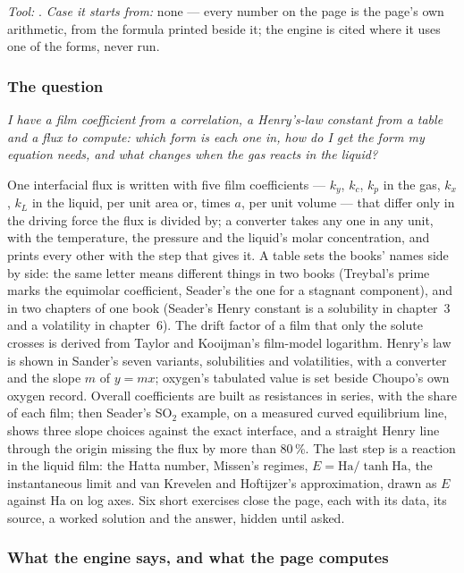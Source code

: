 \documentclass[11pt,a4paper]{article}
\begin{document}

\noindent\textit{\small Tool:} .  \textit{\small
Case it starts from:} none --- every number on the page is the page's own
arithmetic, from the formula printed beside it; the engine is cited where it
uses one of the forms, never run.

\subsubsection*{The question}

\emph{I have a film coefficient from a correlation, a Henry's-law constant from
a table and a flux to compute: which form is each one in, how do I get the form
my equation needs, and what changes when the gas reacts in the liquid?}

One interfacial flux is written with five film coefficients --- $k_y$, $k_c$,
$k_p$ in the gas, $k_x$, $k_L$ in the liquid, per unit area or, times $a$, per
unit volume --- that differ only in the driving force the flux is divided by;
a converter takes any one in any unit, with the temperature, the pressure and
the liquid's molar concentration, and prints every other with the step that
gives it.  A table sets the books' names side by side: the same letter means
different things in two books (Treybal's prime marks the equimolar
coefficient, Seader's the one for a stagnant component), and in two chapters of
one book (Seader's Henry constant is a solubility in chapter~3 and a volatility
in chapter~6).  The drift factor of a film that only the solute crosses is
derived from Taylor and Kooijman's film-model logarithm.  Henry's law is shown
in Sander's seven variants, solubilities and volatilities, with a converter and
the slope $m$ of $y = mx$; oxygen's tabulated value is set beside Choupo's own
oxygen record.  Overall coefficients are built as resistances in series, with
the share of each film; then Seader's SO$_2$ example, on a measured curved
equilibrium line, shows three slope choices against the exact interface, and a
straight Henry line through the origin missing the flux by more than 80\,\%.
The last step is a reaction in the liquid film: the Hatta number, Missen's
regimes, $E = \mathrm{Ha}/\tanh\mathrm{Ha}$, the instantaneous limit and van
Krevelen and Hoftijzer's approximation, drawn as $E$ against Ha on log axes.
Six short exercises close the page, each with its data, its source, a worked
solution and the answer, hidden until asked.

\subsubsection*{What the engine says, and what the page computes}
\end{document}
